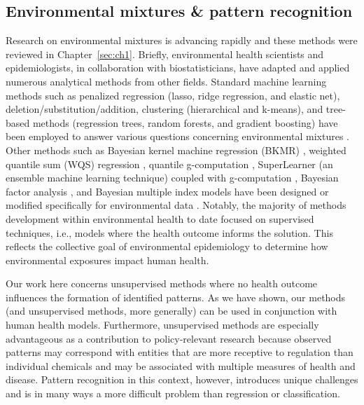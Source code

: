 \subsection{Environmental mixtures \& pattern recognition}
\label{sec:mixtures}
Research on environmental mixtures is advancing rapidly and these methods were reviewed in Chapter~\ref{sec:ch1}. Briefly, environmental health scientists and epidemiologists, in collaboration with biostatisticians, have adapted and applied numerous analytical methods from other fields. Standard machine learning methods such as penalized regression (lasso, ridge regression, and elastic net), deletion/substitution/addition, clustering (hierarchical and k-means), and tree-based methods (regression trees, random forests, and gradient boosting) have been employed to answer various questions concerning environmental mixtures \citep{tanner2020environmental, oskar2020machine, choirat2019data, vuong2020chemical, lazarevic2019statistical, coker2018multi, hamra2018environmental, huang2018cumulative, stafoggia2017statistical}. Other methods such as Bayesian kernel machine regression (BKMR) \citep{bobb2014bayesian, bobb2018statistical}, weighted quantile sum (WQS) regression \citep{carrico15}, quantile g-computation \citep{keil2020quantile}, SuperLearner (an ensemble machine learning technique) coupled with g-computation \citep{oulhote2019joint}, Bayesian factor analysis \citep{ferrari2020bayesian, bhattacharya2011sparse}, and Bayesian multiple index models have been designed or modified specifically for environmental data \citep{mcgee2021bayesian}. Notably, the majority of methods development within environmental health to date focused on supervised techniques, i.e., models where the health outcome informs the solution. This reflects the collective goal of environmental epidemiology to determine how environmental exposures impact human health.

Our work here concerns unsupervised methods where no health outcome influences the formation of identified patterns. As we have shown, our methods (and unsupervised methods, more generally) can be used in conjunction with human health models.  Furthermore, unsupervised methods are especially advantageous as a contribution to policy-relevant research because observed patterns may correspond with entities that are more receptive to regulation than individual chemicals and may be associated with multiple measures of health and disease. Pattern recognition in this context, however, introduces unique challenges and is in many ways a more difficult problem than regression or classification.

